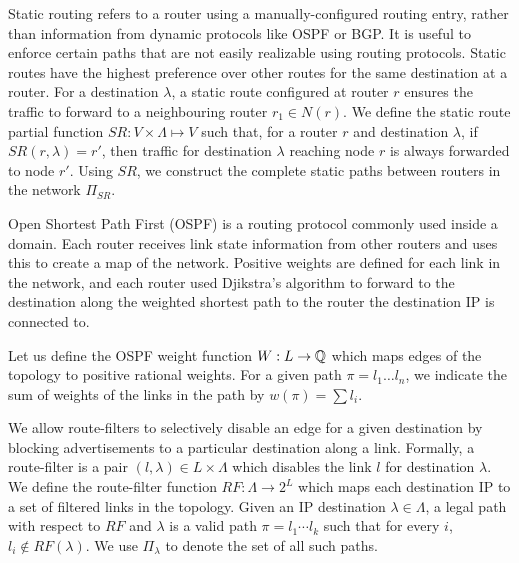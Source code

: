  Static routing refers to a router using a
manually-configured routing entry, rather than information from
dynamic protocols like OSPF or BGP.  It is useful to enforce certain
paths that are not easily realizable using routing protocols.  Static
routes have the highest preference over other routes for the same
destination at a router.  For a destination $\lambda$, a static route
configured at router $r$ ensures the traffic to forward to a
neighbouring router $r_1 \in N(r)$. We define the static route partial
function $SR: V \times \Lambda \mapsto V$ such that, for a router $r$
and destination $\lambda$, if $SR(r,\lambda)=r'$, then traffic for
destination $\lambda$ reaching node $r$ is always forwarded to node
$r'$.    Using $SR$, we
construct the complete static paths between routers in the network
$\Pi_{SR}$.


 Open Shortest Path First (OSPF) is a routing
protocol commonly used inside a domain. Each router receives link
state information from other routers and uses this to create a map of
the network. Positive weights are defined for each link in the
network, and each router used Djikstra's algorithm to forward to the
destination along the weighted shortest path to the router the
destination IP is connected to.

Let us
define the OSPF weight function $W: L \rightarrow \mathbb{Q}$ which 
maps edges of the topology to positive rational weights. 
For a given
path $\pi=l_1\ldots l_n$, we indicate the sum of weights of the
links in the path by $w(\pi)=\sum l_i$. 


We allow route-filters
to selectively disable an
edge for a given destination by  
blocking advertisements to a
particular destination along a link. 
Formally, a route-filter is a pair $(l,\lambda)\in L\times \Lambda$
which disables the link $l$ for destination $\lambda$. 
We define the route-filter function 
$RF: \Lambda \rightarrow 2^L$ which maps each destination IP
to a set of filtered links in the topology. 
Given an IP destination $\lambda\in \Lambda$, 
a legal path with respect to $RF$ and $\lambda$
is a valid path $\pi=l_1\cdots l_k$ such that for every $i$,
$l_i\not\in RF(\lambda)$.
We use $\Pi_\lambda$ to denote the set of all such paths.

